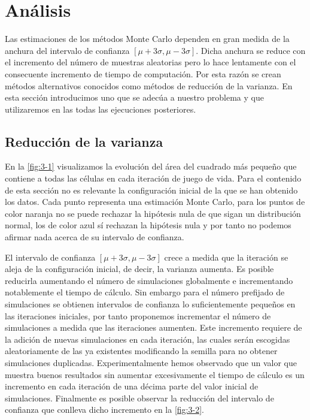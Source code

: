 \documentclass[../proyecto.tex]{memoir}
\begin{document}
\chapter{Análisis}

Las estimaciones de los métodos Monte Carlo dependen en gran medida de la anchura del intervalo de confianza $[\mu+3\sigma, \mu-3\sigma]$. Dicha anchura se reduce con el incremento del número de muestras aleatorias pero lo hace lentamente con el consecuente incremento de tiempo de computación. Por esta razón se crean métodos alternativos conocidos como métodos de reducción de la varianza. En esta sección introducimos uno que se adecúa a nuestro problema y que utilizaremos en las todas las ejecuciones posteriores.

\section{Reducción de la varianza}

En la \autoref{fig:3-1} visualizamos la evolución del área del cuadrado más pequeño que contiene a todas las células en cada iteración de juego de vida. Para el contenido de esta sección no es relevante la configuración inicial de la que se han obtenido los datos. Cada punto representa una estimación Monte Carlo, para los puntos de color naranja no se puede rechazar la hipótesis nula de que sigan un distribución normal, los de color azul sí rechazan la hipótesis nula y por tanto no podemos afirmar nada acerca de su intervalo de confianza.

El intervalo de confianza $[\mu+3\sigma, \mu-3\sigma]$ crece a medida que la iteración se aleja de la configuración inicial, de decir, la varianza aumenta. Es posible reducirla aumentando el número de simulaciones globalmente e incrementando notablemente el tiempo de cálculo. Sin embargo para el número prefijado de simulaciones se obtienen intervalos de confianza lo suficientemente pequeños en las iteraciones iniciales, por tanto proponemos incrementar el número de simulaciones a medida que las iteraciones aumenten. Este incremento requiere de la adición de nuevas simulaciones en cada iteración, las cuales serán escogidas aleatoriamente de las ya existentes modificando la semilla para no obtener simulaciones duplicadas. Experimentalmente hemos observado que un valor que muestra buenos resultados sin aumentar excesivamente el tiempo de cálculo es un incremento en cada iteración de una décima parte del valor inicial de simulaciones. Finalmente es posible observar la reducción del intervalo de confianza que conlleva dicho incremento en la \autoref{fig:3-2}.
\end{document}

